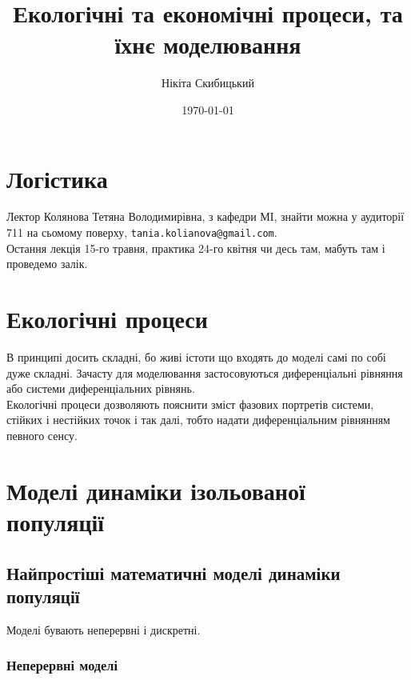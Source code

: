 

\author{Нікіта Скибицький}
\title{Екологічні та економічні процеси, та їхнє моделювання}
\date{\today}



\maketitle

\tableofcontents

\section*{Логістика}

Лектор Колянова Тетяна Володимирівна, з кафедри МІ, знайти можна у аудиторії 711 на сьомому поверху, \texttt{tania.kolianova@gmail.com}. \\

Остання лекція 15-го травня, практика 24-го квітня чи десь там, мабуть там і проведемо залік.

\section*{Екологічні процеси}

В принципі досить складні, бо живі істоти що входять до моделі самі по собі дуже складні. Зачасту для моделювання застосовуються диференціальні рівняння або системи диференціальних рівнянь. \\

Екологічні процеси дозволяють пояснити зміст фазових портретів системи, стійких і нестійких точок і так далі, тобто надати диференціальним рівнянням певного сенсу.

\section{Моделі динаміки ізольованої популяції}

\subsection{Найпростіші математичні моделі динаміки популяції}

Моделі бувають неперервні і дискретні.

\subsubsection{Неперервні моделі}


